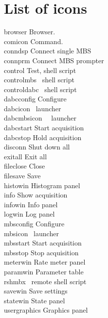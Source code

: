 {\section{List of icons}
 browser Browser.\\
 comicon Command.\\
 conndsp Connect single MBS\\
 connprm Connect MBS prompter\\
 control Test, shell script\\
 controlmbs \dabc\ shell script\\
 controldabc \mbs\ shell script\\
 dabcconfig Configure\\
 dabcicon \dabc\ launcher\\
 dabcmbsicon \dabc\ \mbs\ launcher\\
 dabcstart Start acquisition\\
 dabcstop Hold acquisition\\
 disconn Shut down all \\
 exitall Exit all\\
 fileclose Close\\
 filesave Save\\
 histowin Histogram panel\\
 info Show acquisition\\
 infowin Info panel\\
 logwin Log panel\\
 mbsconfig Configure\\
 mbsicon \mbs\ launcher\\
 mbsstart Start acquisition\\
 mbsstop Stop acquisition\\
 meterwin Rate meter panel\\
 paramwin Parameter table\\
 rshmbx \mbs\ remote shell script\\
 savewin Save settings\\
 statewin State panel\\
 usergraphics Graphics panel\\
}
